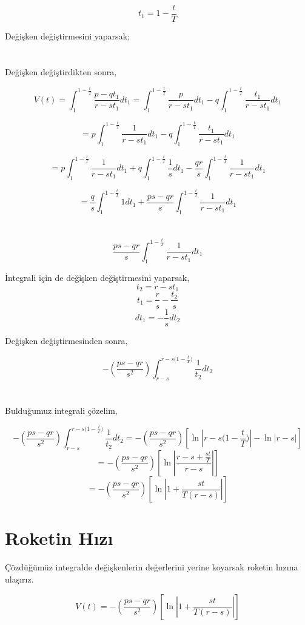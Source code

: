 \documentclass[a4paper,10pt]{article}
\begin{document}
 \[
  t_1 = 1 - \frac{t}{T}
 \]
 
    Değişken değiştirmesini yaparsak;
    
\section{}

Değişken değiştirdikten sonra,

\[
 V(t) = \int_1^{1-\frac{t}{T}}\frac{p-qt_1}{r-st_1} dt_1 = \int_1^{1-\frac{t}{T}}\frac{p}{r-st_1} dt_1 - q \int_1^{1-\frac{t}{T}}\frac{t_1}{r-st_1} dt_1
\]

\[ 
 = p\int_1^{1-\frac{t}{T}}\frac{1}{r-st_1} dt_1 - q \int_1^{1-\frac{t}{T}}\frac{t_1}{r-st_1}dt_1
\]

\[ 
 = p\int_1^{1-\frac{t}{T}}\frac{1}{r-st_1} dt_1 +q \int_1^{1-\frac{t}{T}}\frac{1}{s} dt_1 -\frac{qr}{s}\int_1^{1-\frac{t}{T}}\frac{1}{r-st_1} dt_1
\]

\[
 = \frac{q}{s}\int_1^{1-\frac{t}{T}}{1}dt_1 + \frac{ps-qr}{s}\int_1^{1-\frac{t}{T}}\frac{1}{r-st_1} dt_1
\]

\section{}

\[
\frac{ps-qr}{s}\int_1^{1-\frac{t}{T}}\frac{1}{r-st_1} dt_1
\]

İntegrali için de değişken değiştirmesini yaparsak,
\[
 t_2 = r-st_1
 \]
 \[
 t_1 = \frac{r}{s} - \frac{t_2}{s}
\]
\[
 dt_1 = - \frac{1}{s}dt_2
\]

Değişken değiştirmesinden sonra,

\[
 -(\frac{ps-qr}{s^2})\int_{r-s}^{r-s{(1-\frac{t}{T}})}\frac{1}{t_2}dt_2
\]

\section{}
Bulduğumuz integrali çözelim,

\[
 -(\frac{ps-qr}{s^2})\int_{r-s}^{r-s{(1-\frac{t}{T}})} \frac{1}{t_2}dt_2  = -(\frac{ps-qr}{s^2})[\ln{|{r-s{(1-\frac{t}{T}})}|} - \ln{|r-s|}]
 \]
\[
 = -(\frac{ps-qr}{s^2})[\ln|{\frac{r-s+\frac{st}{T}}{r-s}}|]
\]
\[
 = -(\frac{ps-qr}{s^2})[\ln|1 + \frac{st}{T(r-s)}|]
\]

\section{Roketin Hızı}
  Çözdüğümüz integralde değişkenlerin değerlerini yerine koyarsak roketin hızına ulaşırız. 
  
\[
 V(t) =  -(\frac{ps-qr}{s^2})[\ln|1 + \frac{st}{T(r-s)}|]
\]
\end{document}
